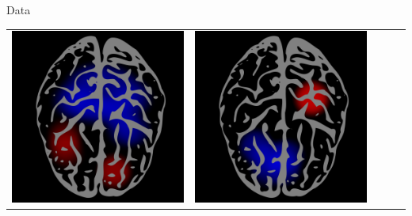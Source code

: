 \documentclass[final]{beamer}
\newlength{\onecolwid}
\begin{document}
\begin{frame}[t]
\begin{columns}[t]
\begin{column}{\onecolwid}
\begin{block}{Data}
\begin{center}
\begin{tabular}{ccccc}
\includegraphics[scale = 0.06]{brain1.png} &
\includegraphics[scale = 0.06]{brain2.png} &

\end{tabular}
\end{center}
\end{block}
\end{column}
\end{columns}
\end{frame}
\end{document}

